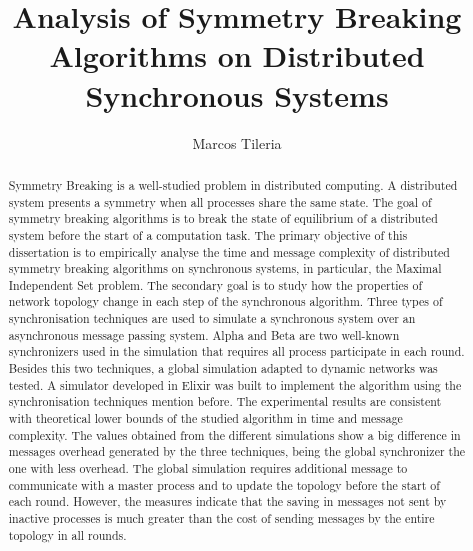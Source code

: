 \documentclass[11pt]{article} %
\title{Analysis of Symmetry Breaking Algorithms on Distributed Synchronous Systems}
\author{Marcos Tileria}
\theoremstyle{plain}
\theoremstyle{definition}
\begin{document}
\maketitle

\declaration

\begin{abstract}


Symmetry Breaking is a well-studied problem in distributed computing. A distributed system presents a symmetry when all processes share the same state. The goal of symmetry breaking algorithms is to break the state of equilibrium of a distributed system before the start of a computation task. The primary objective of this dissertation is to empirically analyse the time and message complexity of distributed symmetry breaking algorithms on synchronous systems, in particular, the Maximal Independent Set problem. The secondary goal is to study how the properties of network topology change in each step of the synchronous algorithm. Three types of synchronisation techniques are used to simulate a synchronous system over an asynchronous message passing system. Alpha and Beta are two well-known synchronizers used in the simulation that requires all process participate in each round. Besides this two techniques, a global simulation adapted to dynamic networks was tested. A simulator developed in Elixir was built to implement the algorithm using the synchronisation techniques mention before. The experimental results are consistent with theoretical lower bounds of the studied algorithm in time and message complexity. The values obtained from the different simulations show a big difference in messages overhead generated by the three techniques, being the global synchronizer the one with less overhead. The global simulation requires additional message to communicate with a master process and to update the topology before the start of each round. However, the measures indicate that the saving in messages not sent by inactive processes is much greater than the cost of sending messages by the entire topology in all rounds.
 
\end{abstract}




 \newpage




 \newpage


\newpage


 \newpage


 \newpage


 \newpage


 \newpage




\end{document}
